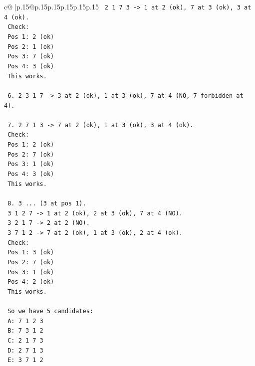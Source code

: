\documentclass{article}
\begin{document}
{\begin{supertabular}{c@{$\;$}|p{.15\linewidth}@{}p{.15\linewidth}p{.15\linewidth}p{.15\linewidth}p{.15\linewidth}p{.15\linewidth}}
{{{\texttt{       2 1 7 3 {-}> 1 at 2 (ok), 7 at 3 (ok), 3 at 4 (ok).} \\
\texttt{       Check:} \\
\texttt{       Pos 1: 2 (ok)} \\
\texttt{       Pos 2: 1 (ok)} \\
\texttt{       Pos 3: 7 (ok)} \\
\texttt{       Pos 4: 3 (ok)} \\
\texttt{       This works.} \\
\\ 
\texttt{    6. 2 3 1 7 {-}> 3 at 2 (ok), 1 at 3 (ok), 7 at 4 (NO, 7 forbidden at 4).} \\
\\ 
\texttt{    7. 2 7 1 3 {-}> 7 at 2 (ok), 1 at 3 (ok), 3 at 4 (ok).} \\
\texttt{       Check:} \\
\texttt{       Pos 1: 2 (ok)} \\
\texttt{       Pos 2: 7 (ok)} \\
\texttt{       Pos 3: 1 (ok)} \\
\texttt{       Pos 4: 3 (ok)} \\
\texttt{       This works.} \\
\\ 
\texttt{    8. 3 ... (3 at pos 1).} \\
\texttt{       3 1 2 7 {-}> 1 at 2 (ok), 2 at 3 (ok), 7 at 4 (NO).} \\
\texttt{       3 2 1 7 {-}> 2 at 2 (NO).} \\
\texttt{       3 7 1 2 {-}> 7 at 2 (ok), 1 at 3 (ok), 2 at 4 (ok).} \\
\texttt{       Check:} \\
\texttt{       Pos 1: 3 (ok)} \\
\texttt{       Pos 2: 7 (ok)} \\
\texttt{       Pos 3: 1 (ok)} \\
\texttt{       Pos 4: 2 (ok)} \\
\texttt{       This works.} \\
\\ 
\texttt{    So we have 5 candidates:} \\
\texttt{    A: 7 1 2 3} \\
\texttt{    B: 7 3 1 2} \\
\texttt{    C: 2 1 7 3} \\
\texttt{    D: 2 7 1 3} \\
\texttt{    E: 3 7 1 2} \\
}}}
\end{supertabular}}
\end{document}
